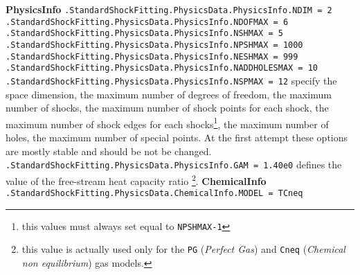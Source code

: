 \documentclass[11pt,a4paper,oneside]{article}
\begin{document}
\textbf{PhysicsInfo}
\newline
\newline
\hspace*{1cm} \texttt{.StandardShockFitting.PhysicsData.PhysicsInfo.NDIM = 2}
\newline
\hspace*{1cm} \texttt{.StandardShockFitting.PhysicsData.PhysicsInfo.NDOFMAX = 6}
\newline
\hspace*{1cm} \texttt{.StandardShockFitting.PhysicsData.PhysicsInfo.NSHMAX = 5}
\newline
\hspace*{1cm} \texttt{.StandardShockFitting.PhysicsData.PhysicsInfo.NPSHMAX = 1000}
\newline
\hspace*{1cm} \texttt{.StandardShockFitting.PhysicsData.PhysicsInfo.NESHMAX = 999}
\newline
\hspace*{1cm} \texttt{.StandardShockFitting.PhysicsData.PhysicsInfo.NADDHOLESMAX = 10}
\newline
\hspace*{1cm} \texttt{.StandardShockFitting.PhysicsData.PhysicsInfo.NSPMAX = 12}
\newline
\newline
specify the space dimension, the maximum number of degrees of freedom, the maximum number of shocks, the maximum number of shock points for each shock, the maximum number of shock edges for each shocks\footnote{this values must always set equal to \texttt{NPSHMAX-1}}, the maximum number of holes, the maximum number of special points.
\newline
At the first attempt these options are mostly stable and should be not be changed.
\newline
\newline
\hspace*{1cm} \texttt{.StandardShockFitting.PhysicsData.PhysicsInfo.GAM = 1.40e0}
\newline
\newline
defines the value of the free-stream heat capacity ratio \footnote {this value is actually used only for the \texttt{PG} (\textit{Perfect Gas}) and \texttt{Cneq} (\textit{Chemical non equilibrium}) gas models.}.
\newline
\newline
\textbf{ChemicalInfo}
\newline
\newline
\hspace*{1cm} \texttt{.StandardShockFitting.PhysicsData.ChemicalInfo.MODEL = TCneq}
\end{document}
